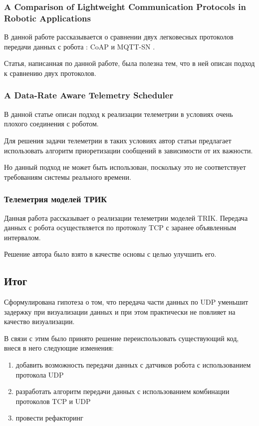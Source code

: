 \documentclass[14pt]{matmex-diploma-custom.cls}
\begin{document}
\subsubsection*{A Comparison of Lightweight Communication Protocols in Robotic Applications \cite{comp}}
В данной работе рассказывается о сравнении двух легковесных протоколов передачи данных с робота : CoAP \cite{coap} и MQTT-SN \cite{mqtt}.

Статья, написанная по данной работе, была полезна тем, что в ней описан подход к сравнению двух протоколов.

\subsubsection*{A Data-Rate Aware Telemetry Scheduler \cite{datarate}}
В данной статье описан подход к реализации телеметрии в условиях очень плохого соединения с роботом.

Для решения задачи телеметрии в таких условиях автор статьи предлагает использовать алгоритм приоретизации сообщений в зависимости от их важности.

Но данный подход не может быть использован, поскольку это не соответствует требованиям системы реального времени.

\subsubsection*{Телеметрия моделей ТРИК \cite{m}}
Данная работа рассказывает о реализации телеметрии моделей TRIK. Передача данных с робота осуществляется по протоколу TCP с заранее объявленным интервалом.

Решение автора было взято в качестве основы с целью улучшить его. 

\subsection{Итог}
Сформулирована гипотеза о том, что передача части данных по UDP уменьшит задержку при визуализации данных и при этом практически не повлияет на качество визуализации.

В связи с этим было принято решение переиспользовать существующий код, внеся в него следующие изменения:
\begin{enumerate}  
\item добавить возможность передачи данных с датчиков робота с использованием протокола UDP 
\item разработать алгоритм передачи данных с использованием комбинации протоколов TCP и UDP
\item провести рефакторинг
\end{enumerate}
\end{document}
